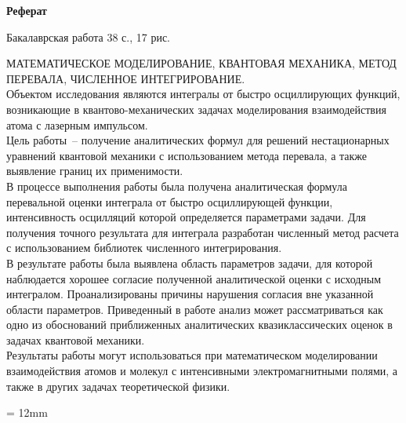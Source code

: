 \documentclass[14pt]{article}
\numberwithin{figure}{section}
\numberwithin{equation}{section}
\begin{document}
\newpage%
\addtocounter{page}{1}
\begin{center}
{\normalsize \textbf{Реферат}}
\end{center}

\begin{flushleft}
Бакалаврская работа 38 с., 17 рис.         \\
\vspace{0.5cm}

МАТЕМАТИЧЕСКОЕ МОДЕЛИРОВАНИЕ, КВАНТОВАЯ МЕХАНИКА, МЕТОД ПЕРЕВАЛА, ЧИСЛЕННОЕ ИНТЕГРИРОВАНИЕ. \\	
\vspace{0.5cm}
Объектом исследования являются интегралы от быстро осциллирующих функций, возникающие в квантово-механических задачах моделирования взаимодействия атома с лазерным импульсом. \\
\vspace{0.5cm}
Цель работы~-- получение аналитических формул для решений нестационарных уравнений квантовой механики с использованием метода перевала, а также выявление границ их применимости.\\
\vspace{0.5cm}
В процессе выполнения работы была получена аналитическая формула перевальной оценки интеграла от быстро осциллирующей функции, интенсивность осцилляций которой определяется параметрами задачи. Для получения точного результата для интеграла разработан численный метод расчета с использованием библиотек численного интегрирования. \\
\vspace{0.5cm}
В результате работы была выявлена область параметров задачи, для которой наблюдается хорошее согласие полученной аналитической оценки с исходным интегралом. Проанализированы причины нарушения согласия вне указанной области параметров. Приведенный в работе анализ может рассматриваться как одно из обоснований приближенных аналитических квазиклассических оценок в задачах квантовой механики. \\
\vspace{0.5cm}
Результаты работы могут использоваться при математическом моделировании взаимодействия атомов и молекул с интенсивными электромагнитными полями, а также в других задачах теоретической физики. 
\end{flushleft}

{}
\parindent = 12mm

\end{document}
